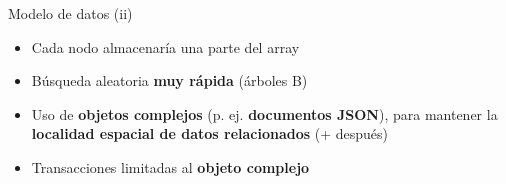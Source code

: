 \documentclass[14pt]{beamer}
\begin{document}
\begin{frame}
\begin{overlayarea}{\textwidth}{.8\textheight}
{\begin{block}{Modelo de datos (ii)}
\begin{itemize}
\begin{itemize}
\item Cada nodo almacenaría una parte del array
\item Búsqueda aleatoria {\bf muy rápida} (árboles B)
\item Uso de {\bf objetos complejos} (p. ej. {\bf documentos JSON}),
  para mantener la {\bf localidad espacial de datos relacionados} (+
  después)
\item Transacciones limitadas al {\bf objeto complejo}
\end{itemize}
\end{itemize}
\end{block}%
}%
\end{overlayarea}
\end{frame}






\end{document}
